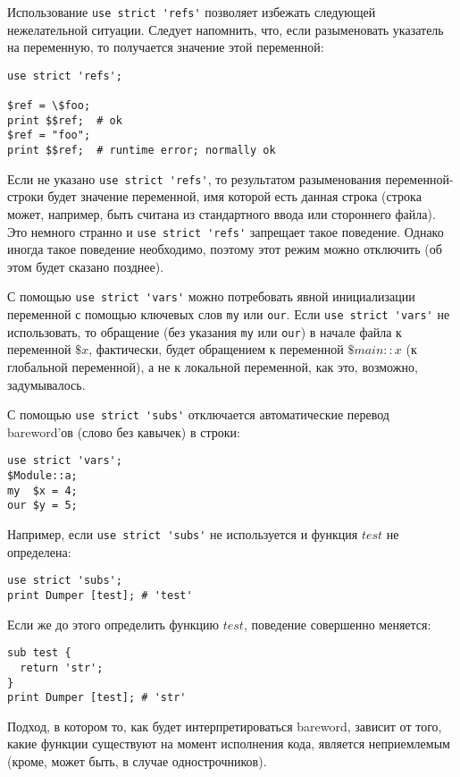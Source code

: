 Использование \verb|use strict 'refs'| позволяет избежать следующей нежелательной ситуации. Следует напомнить, что, если разыменовать указатель на переменную, то получается значение этой переменной:
\begin{verbatim}
use strict 'refs';

$ref = \$foo;
print $$ref;  # ok
$ref = "foo";
print $$ref;  # runtime error; normally ok
\end{verbatim}
Если не указано \verb|use strict 'refs'|, то результатом разыменования переменной-строки будет значение переменной, имя которой есть данная строка (строка может, например, быть считана из стандартного ввода или стороннего файла). Это немного странно и \verb|use strict 'refs'| запрещает такое поведение. Однако иногда такое поведение необходимо, поэтому этот режим можно отключить (об этом будет сказано позднее).

С помощью \verb|use strict 'vars'| можно потребовать явной инициализации переменной с помощью ключевых слов \verb|my| или \verb|our|. Если \verb|use strict 'vars'| не использовать, то обращение (без указания \verb|my| или \verb|our|) в начале файла к переменной $\$x$, фактически, будет обращением к переменной $\$main::x$ (к глобальной переменной), а не к локальной переменной, как это, возможно, задумывалось.

С помощью \verb|use strict 'subs'| отключается автоматические перевод bareword'ов (слово без кавычек) в строки:
\begin{verbatim}
use strict 'vars';
$Module::a;
my  $x = 4;
our $y = 5;
\end{verbatim}
Например, если \verb|use strict 'subs'| не используется и функция $test$ не определена:
\begin{verbatim}
use strict 'subs';
print Dumper [test]; # 'test'
\end{verbatim}
Если же до этого определить функцию $test$, поведение совершенно меняется:
\begin{verbatim}
sub test {
  return 'str';
}
print Dumper [test]; # 'str'
\end{verbatim}
Подход, в котором то, как будет интерпретироваться bareword, зависит от того, какие функции существуют на момент исполнения кода, является неприемлемым (кроме, может быть, в случае однострочников).

